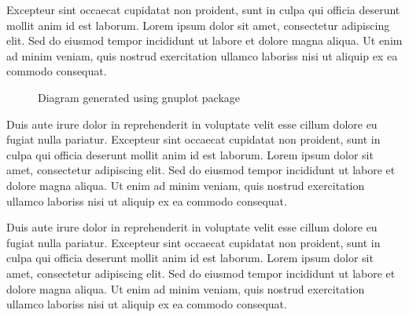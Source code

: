 Excepteur sint occaecat cupidatat non proident, sunt in culpa qui officia deserunt mollit anim id est laborum.
Lorem ipsum dolor sit amet, consectetur adipiscing elit. 
Sed do eiusmod tempor incididunt ut labore et dolore magna aliqua. 
Ut enim ad minim veniam, quis nostrud exercitation ullamco laboriss nisi ut aliquip ex ea commodo consequat.
%
\begin{figure}[H]
\begin{center}
\scalebox{0.8}{}
\end{center}
\caption{Diagram generated using gnuplot package}
\label{diag:beams}
\end{figure}
%
Duis aute irure dolor in reprehenderit in voluptate velit esse cillum dolore eu fugiat nulla pariatur.
Excepteur sint occaecat cupidatat non proident, sunt in culpa qui officia deserunt mollit anim id est laborum.
Lorem ipsum dolor sit amet, consectetur adipiscing elit. 
Sed do eiusmod tempor incididunt ut labore et dolore magna aliqua. 
Ut enim ad minim veniam, quis nostrud exercitation ullamco laboriss nisi ut aliquip ex ea commodo consequat.
%
\begin{table}[h]
\centering
\caption{Table example}
\label{tab:parameters}
\end{table}
%
Duis aute irure dolor in reprehenderit in voluptate velit esse cillum dolore eu fugiat nulla pariatur.
Excepteur sint occaecat cupidatat non proident, sunt in culpa qui officia deserunt mollit anim id est laborum.
Lorem ipsum dolor sit amet, consectetur adipiscing elit. 
Sed do eiusmod tempor incididunt ut labore et dolore magna aliqua. 
Ut enim ad minim veniam, quis nostrud exercitation ullamco laboriss nisi ut aliquip ex ea commodo consequat.
%
%


